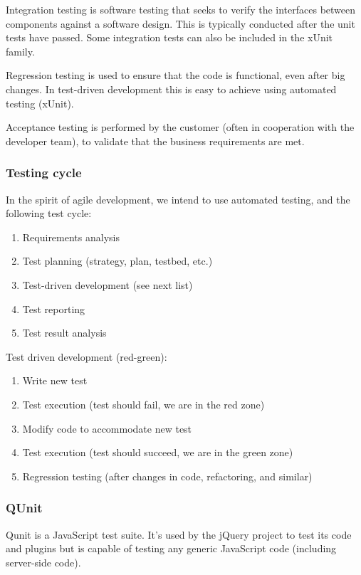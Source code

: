 Integration testing is software testing that seeks to verify the interfaces
between components against a software design. This is typically conducted after
the unit tests have passed. Some integration tests can also be included in the
xUnit family.

Regression testing is used to ensure that the code is functional, even after
big changes. In test-driven development this is easy to achieve using automated
testing (xUnit).

Acceptance testing is performed by the customer (often in cooperation with the
developer team), to validate that the business requirements are met.

\subsubsection{Testing cycle}

In the spirit of agile development, we intend to use automated testing, and the
following test cycle:

\begin{enumerate}
	\item Requirements analysis
	\item Test planning (strategy, plan, testbed, etc.)
	\item Test-driven development (see next list)
	\item Test reporting
	\item Test result analysis
\end{enumerate}

Test driven development (red-green):
\begin{enumerate}
	\item Write new test
	\item Test execution (test should fail, we are in the red zone)
	\item Modify code to accommodate new test
	\item Test execution (test should succeed, we are in the green zone)
	\item Regression testing (after changes in code, refactoring, and similar)
\end{enumerate}

\subsubsection{QUnit}
\label{sec:pre-study_testing_qunit}
	Qunit is a JavaScript test suite. It's used by the jQuery project to test
	its code and plugins but is capable of testing any generic JavaScript code
	(including server-side code). \cite{jquery:qunit}

